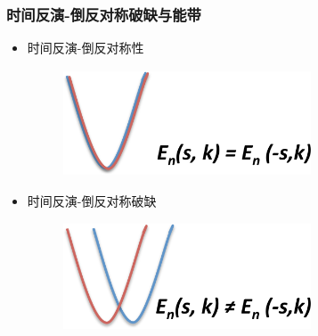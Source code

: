 \frame
{
	\frametitle{时间反演-倒反对称破缺与能带}
	\begin{itemize}
		\item 时间反演-倒反对称性
\begin{figure}[h!]
\centering
\vspace*{-0.15in}
\includegraphics[height=1.25in,width=2.90in,viewport=0 0 1155 530,clip]{Figures/SOC_TRS-IS.png}
\label{Symmetry-TRS-IS}
\end{figure}
\item 时间反演-倒反对称破缺
\begin{figure}[h!]
\centering
\vspace*{-0.15in}
\includegraphics[height=1.25in,width=2.90in,viewport=0 0 1155 530,clip]{Figures/SOC_TRS-IS_breaking.png}
\label{Symmetry-TRS-IS-breaking}
\end{figure}
	\end{itemize}
}

